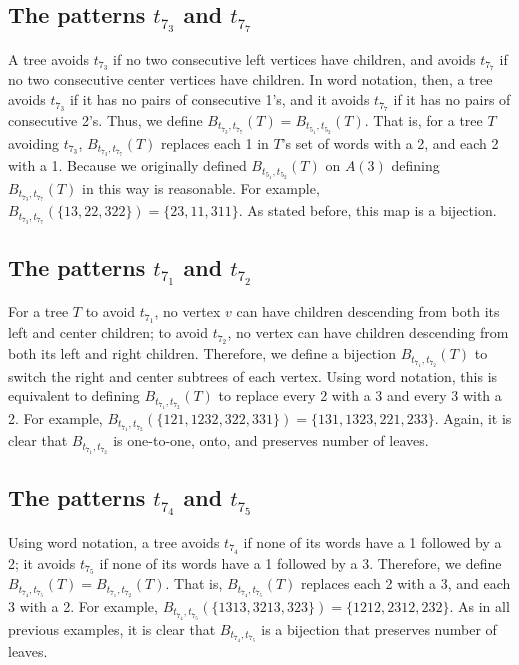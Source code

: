 \documentclass[12pt]{article}
\begin{document}
\subsection{The patterns \texorpdfstring{$t_{7_3}$}{t73} and \texorpdfstring{$t_{7_7}$}{t77}}

A tree avoids $t_{7_3}$ if no two consecutive left vertices have children, and avoids $t_{7_7}$ if no two consecutive center vertices have children.  In word notation, then, a tree avoids $t_{7_3}$ if it has no pairs of consecutive 1's, and it avoids $t_{7_7}$ if it has no pairs of consecutive 2's.  Thus, we define $B_{t_{7_3},t_{7_7}}(T) = B_{t_{5_1},t_{5_2}}(T)$.  That is, for a tree $T$ avoiding $t_{7_3}$, $B_{t_{7_3},t_{7_7}}(T)$ replaces each 1 in $T$'s set of words with a 2, and each 2 with a 1.  Because we originally defined $B_{t_{5_1},t_{5_2}}(T)$ on $A(3)$ defining $B_{t_{7_3},t_{7_7}}(T)$ in this way is reasonable.  For example, $B_{t_{7_3},t_{7_7}}(\{13, 22, 322\}) = \{23, 11, 311\}$.  As stated before, this map is a bijection.

\subsection{The patterns \texorpdfstring{$t_{7_1}$}{t71} and \texorpdfstring{$t_{7_2}$}{t72}}

For a tree $T$ to avoid $t_{7_1}$, no vertex $v$ can have children descending from both its left and center children; to avoid $t_{7_2}$, no vertex can have children descending from both its left and right children.  Therefore, we define a bijection $B_{t_{7_1},t_{7_2}}(T)$ to switch the right and center subtrees of each vertex.  Using word notation, this is equivalent to defining $B_{t_{7_1},t_{7_2}}(T)$ to replace every 2 with a 3 and every 3 with a 2.  For example, $B_{t_{7_1},t_{7_2}}( \{ 121, 1232, 322, 331 \} ) = \{ 131, 1323, 221, 233\}$.  Again, it is clear that $B_{t_{7_1},t_{7_2}}$ is one-to-one, onto, and preserves number of leaves.

\subsection{The patterns \texorpdfstring{$t_{7_4}$}{t74} and \texorpdfstring{$t_{7_5}$}{t75}}

Using word notation, a tree avoids $t_{7_4}$ if none of its words have a 1 followed by a 2; it avoids $t_{7_5}$ if none of its words have a 1 followed by a 3.  Therefore, we define $B_{t_{7_4},t_{7_5}}(T)=B_{t_{7_1},t_{7_2}}(T)$.  That is, $B_{t_{7_4},t_{7_5}}(T)$ replaces each 2 with a 3, and each 3 with a 2. For example, $B_{t_{7_4},t_{7_5}}(\{1313, 3213, 323\}) = \{1212, 2312, 232\}$.  As in all previous examples, it is clear that $B_{t_{7_4}, t_{7_5}}$ is a bijection that preserves number of leaves.
\end{document}
